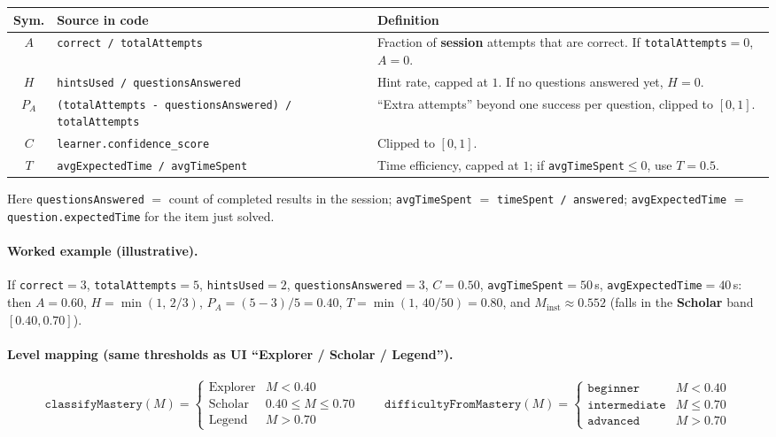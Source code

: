 \documentclass[12pt,a4paper]{article}
\begin{document}
\renewcommand{\arraystretch}{1.4}
\begin{tabularx}{\linewidth}{@{}c l X@{}}
\toprule
\textbf{Sym.} & \textbf{Source in code} & \textbf{Definition} \\
\midrule
$A$ & \texttt{correct / totalAttempts} &
Fraction of \textbf{session} attempts that are correct. If \texttt{totalAttempts}$=0$, $A=0$. \\
\rowcolor{rowhighlight}
$H$ & \texttt{hintsUsed / questionsAnswered} &
Hint rate, capped at $1$. If no questions answered yet, $H=0$. \\
$P_A$ & \texttt{(totalAttempts - questionsAnswered) / totalAttempts} &
``Extra attempts'' beyond one success per question, clipped to $[0,1]$. \\
\rowcolor{rowhighlight}
$C$ & \texttt{learner.confidence\_score} &
Clipped to $[0,1]$. \\
$T$ & \texttt{avgExpectedTime / avgTimeSpent} &
Time efficiency, capped at $1$; if \texttt{avgTimeSpent}$\le 0$, use $T=0.5$. \\
\bottomrule
\end{tabularx}

\noindent Here \texttt{questionsAnswered} $=$ count of completed results in the session;
\texttt{avgTimeSpent} $=$ \texttt{timeSpent / answered}; \texttt{avgExpectedTime} $=$ \texttt{question.expectedTime} for the item just solved.

\paragraph{Worked example (illustrative).}
If \texttt{correct}$=3$, \texttt{totalAttempts}$=5$, \texttt{hintsUsed}$=2$, \texttt{questionsAnswered}$=3$,
$C=0.50$, \texttt{avgTimeSpent}$=50$\,s, \texttt{avgExpectedTime}$=40$\,s: then
$A=0.60$, $H=\min(1,\,2/3)$, $P_A=(5-3)/5=0.40$, $T=\min(1,\,40/50)=0.80$, and
$M_{\mathrm{inst}} \approx 0.552$ (falls in the \textbf{Scholar} band $[0.40,0.70]$).

\paragraph{Level mapping (same thresholds as UI ``Explorer / Scholar / Legend'').}
\[
\texttt{classifyMastery}(M)=
\begin{cases}
\text{Explorer} & M < 0.40 \\
\text{Scholar} & 0.40 \le M \le 0.70 \\
\text{Legend} & M > 0.70
\end{cases}
\qquad
\texttt{difficultyFromMastery}(M)=
\begin{cases}
\texttt{beginner} & M < 0.40 \\
\texttt{intermediate} & M \le 0.70 \\
\texttt{advanced} & M > 0.70
\end{cases}
\]
\end{document}
